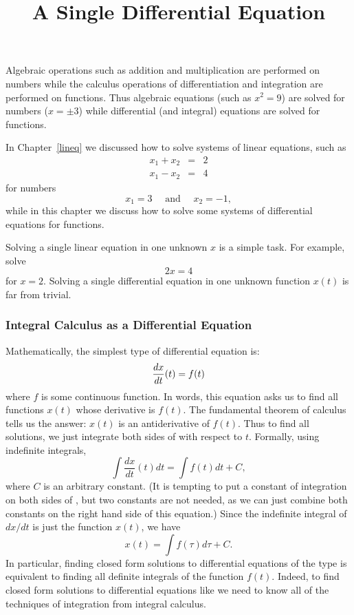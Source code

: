 \documentclass{ximera}
\title{A Single Differential Equation}
\begin{document}
\begin{abstract}
\end{abstract}
\maketitle

  \label{S:growthmodels}

Algebraic operations such as addition and multiplication are
performed on numbers while the calculus operations of
differentiation and integration are performed on functions.
Thus algebraic equations (such as $x^2=9$) are solved for
numbers ($x=\pm 3$) while differential (and integral) equations
are solved for functions.

In Chapter~\ref{lineq} we discussed how to solve systems of
linear equations, such as
\begin{eqnarray*}
x_1 + x_2 & = & 2 \\
x_1 - x_2 & = & 4
\end{eqnarray*}
for numbers
\[
x_1=3 \quad \mbox{ and } \quad x_2=-1,
\]
while in this chapter we discuss how to solve some systems of
differential equations for functions.

Solving a single linear equation in one unknown $x$ is a simple
task.  For example, solve
\[
2x = 4
\]
for $x=2$.  Solving a single differential equation in one unknown function
$x(t)$ is far from trivial.

\subsubsection*{Integral Calculus as a Differential Equation}

Mathematically, the simplest type of differential equation is:
\begin{equation} \label{e:intcalc}
\displaystyle\frac{dx}{dt}(t) = f(t)
\end{equation}
where $f$ is some continuous function.  In words, this equation asks us
to find all functions $x(t)$ whose derivative is $f(t)$.  The fundamental
theorem of calculus tells us the answer: $x(t)$ is an antiderivative of
$f(t)$.  Thus to find all solutions, we just integrate both sides of
 with respect to $t$.  Formally, using indefinite integrals, 
\begin{equation}  \label{E:integrate}
\int \frac{dx}{dt}(t)dt = \int f(t)dt + C,
\end{equation}
where $C$ is an arbitrary constant.  (It is tempting to put a constant of
integration on both sides of , but two constants are not 
needed, as we can just combine both constants on the right hand side of
this equation.)   Since the indefinite integral of $dx/dt$ is just the
function $x(t)$, we have 
\begin{equation}  \label{e:intcalcsoln}
x(t) = \int f(\tau) d\tau + C.
\end{equation}
In particular, finding closed form solutions to differential equations
of the type  is equivalent to finding all definite
integrals of the function $f(t)$.  Indeed, to find closed form solutions 
to differential equations like  we need to know all of the 
techniques of integration from integral calculus.
\end{document}
